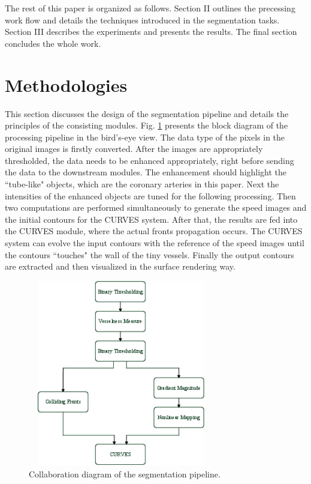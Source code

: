 The rest of this paper is organized as follows.
Section II outlines the precessing work flow and details the techniques introduced in the segmentation tasks.
Section III describes the experiments and presents the results.
The final section concludes the whole work.

\section{Methodologies}

This section discusses the design of the segmentation pipeline and details the principles of the consisting modules.
Fig. \ref{fig:DataFlow} presents the block diagram of the processing pipeline in the bird's-eye view.
The data type of the pixels in the original images is firstly converted.
After the images are appropriately thresholded, the data needs to be enhanced appropriately, right before sending the data to the downstream modules.
The enhancement should highlight the ``tube-like" objects, which are the coronary arteries in this paper.
Next the intensities of the enhanced objects are tuned for the following processing.
Then two computations are performed simultaneously to generate the speed images and the initial contours for the CURVES system.
After that, the results are fed into the CURVES module, where the actual fronts propagation occurs.
The CURVES system can evolve the input contours with the reference of the speed images until the contours ``touches" the wall of the tiny vessels.
Finally the output contours are extracted and then visualized in the surface rendering way.
\begin{figure}[tb]
\centering
\includegraphics[height=3.2in,width=3.2in]{Figures/DataFlow2.png}
\caption{Collaboration diagram of the segmentation pipeline.}
\label{fig:DataFlow}
\end{figure}

